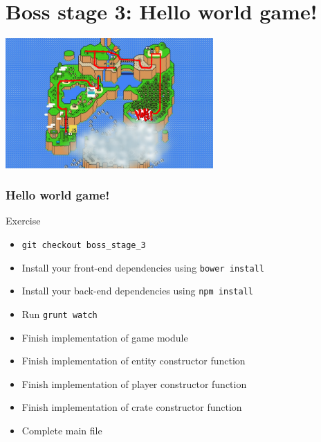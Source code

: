 \section{Boss stage 3: Hello world game!}

\begin{frame}[fragile]
  \begin{center}
    \includegraphics[width=300px]{images/map_boss_stage_3.png}
  \end{center}
\end{frame}

\begin{frame}[fragile]
  \frametitle{Hello world game!}

  \begin{block}{Exercise}
    \begin{itemize}
      \item \texttt{git checkout boss\_stage\_3}
      \item Install your front-end dependencies using \texttt{bower install}
      \item Install your back-end dependencies using \texttt{npm install}
      \item Run \texttt{grunt watch}
      \item Finish implementation of game module
      \item Finish implementation of entity constructor function
      \item Finish implementation of player constructor function
      \item Finish implementation of crate constructor function
      \item Complete main file
    \end{itemize}
  \end{block}
\end{frame}
